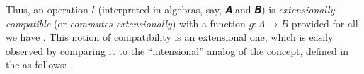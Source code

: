 \documentclass[a4paper,USenglish,cleveref,autoref,thm-restate]{lipics-v2019}
\begin{document}
\begin{code}\end{code}
Thus, an operation 𝑓 (interpreted in algebras, say, 𝑨 and 𝑩) is \emph{extensionally compatible} (or \emph{commutes extensionally}) with a function \(g : A → B\) provided for all
\AgdaSpace{}%
\AgdaSymbol{:}\AgdaSpace{}%
\AgdaSpace{}%
\AgdaSpace{}%
\AgdaSpace{}%
\AgdaSpace{}%
\AgdaSpace{}%
\AgdaSpace{}%
\AgdaSpace{}%
\AgdaSpace{}%
we have 
\AgdaSpace{}%
\AgdaSymbol{((}\AgdaSpace{}%
\AgdaSpace{}%
\AgdaSymbol{)}\AgdaSpace{}%
\AgdaSymbol{)}\AgdaSpace{}%
\AgdaSpace{}%
\AgdaSymbol{(}\AgdaSpace{}%
\AgdaSpace{}%
\AgdaSymbol{)}\AgdaSpace{}%
\AgdaSymbol{(}\AgdaSpace{}%
\AgdaSpace{}%
\AgdaSymbol{)}. This notion of compatibility is an extensional one, which is easily observed by comparing it to the ``intensional'' analog of the concept, defined in the \agdaualib as follows:
\AgdaSpace{}%
\AgdaSpace{}%
\AgdaSpace{}%
\AgdaSpace{}%
\AgdaSymbol{((}\AgdaSpace{}%
\AgdaSpace{}%
\AgdaSymbol{)}\AgdaSpace{}%
\AgdaSymbol{))}\AgdaSpace{}%
\AgdaSpace{}%
\AgdaSpace{}%
\AgdaSpace{}%
\AgdaSpace{}%
\AgdaSymbol{(}\AgdaSpace{}%
\AgdaSpace{}%
\AgdaSymbol{)(}\AgdaSpace{}%
\AgdaSpace{}%
\AgdaSymbol{))}.
\end{document}
